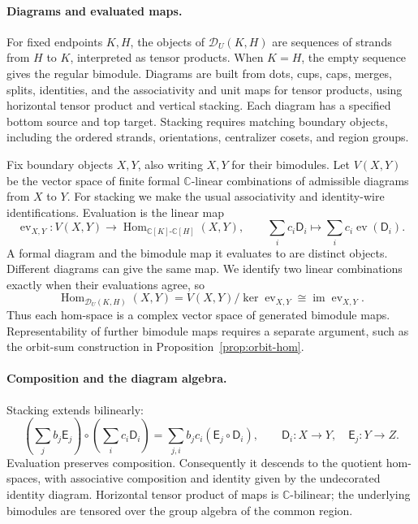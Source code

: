 \documentclass[11pt,a4paper]{article}
\numberwithin{equation}{section}
\theoremstyle{definition}
\newcommand{\C}{\mathbb C}
\newcommand{\Hom}{\operatorname{Hom}}
\begin{document}
\paragraph{Diagrams and evaluated maps.}
For fixed endpoints \(K,H\), the objects of \(\mathcal D_U(K,H)\)
are sequences of strands from \(H\) to \(K\), interpreted as tensor
products. When \(K=H\), the empty sequence gives the regular bimodule.
Diagrams are built from dots, cups, caps, merges, splits, identities,
and the associativity and unit maps for tensor products, using
horizontal tensor product and vertical stacking. Each diagram has a
specified bottom source and top target. Stacking requires matching
boundary objects, including the ordered strands, orientations,
centralizer cosets, and region groups.

Fix boundary objects \(X,Y\), also writing \(X,Y\) for their
bimodules. Let \(V(X,Y)\) be the vector space of finite formal
\(\C\)-linear combinations of admissible diagrams from \(X\) to \(Y\).
For stacking we make the usual associativity and identity-wire
identifications. Evaluation is the linear map
\[
 \operatorname{ev}_{X,Y}:V(X,Y)\longrightarrow
   \Hom_{\C[K]\text{-}\C[H]}(X,Y),\qquad
 \sum_i c_i\mathsf D_i\longmapsto
   \sum_i c_i\operatorname{ev}(\mathsf D_i).
\]
A formal diagram and the bimodule map it evaluates to are distinct
objects. Different diagrams can give the same map. We identify two
linear combinations exactly when their evaluations agree, so
\[
 \Hom_{\mathcal D_U(K,H)}(X,Y)
   =V(X,Y)/\ker\operatorname{ev}_{X,Y}
   \cong\operatorname{im}\operatorname{ev}_{X,Y}.
\]
Thus each hom-space is a complex vector space of generated bimodule
maps. Representability of further bimodule maps requires a separate
argument, such as the orbit-sum construction in
Proposition~\ref{prop:orbit-hom}.

\paragraph{Composition and the diagram algebra.}
Stacking extends bilinearly:
\[
 \left(\sum_j b_j\mathsf E_j\right)\circ
 \left(\sum_i c_i\mathsf D_i\right)
   =\sum_{j,i}b_jc_i(\mathsf E_j\circ\mathsf D_i),
 \qquad \mathsf D_i:X\to Y,\quad\mathsf E_j:Y\to Z.
\]
Evaluation preserves composition. Consequently it descends to the
quotient hom-spaces, with associative composition and identity given
by the undecorated identity diagram. Horizontal tensor product of maps is
\(\mathbb C\)-bilinear; the underlying bimodules are tensored over the
group algebra of the common region.
\end{document}
